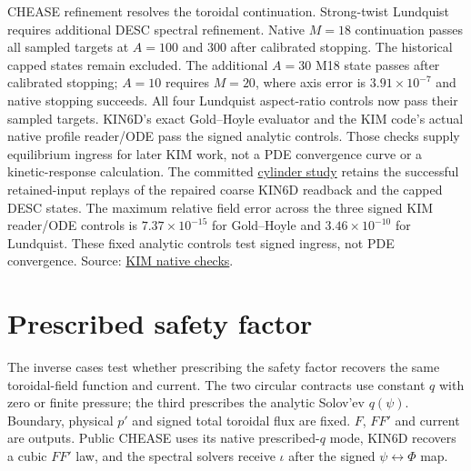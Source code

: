 \documentclass[10pt,a4paper]{article}
\newcommand{\tcroot}{https://gitlab.tugraz.at/plasma/proj/ntv/iter_tc24/-/blob/5f267d12c/}
\newcommand{\tcfile}[2]{\href{\tcroot#1}{#2}}
\newcommand{\pageheading}[1]{\clearpage\section{#1}}
\begin{document}
CHEASE refinement resolves the toroidal continuation. Strong-twist Lundquist
requires additional DESC spectral refinement. Native $M=18$ continuation
passes all sampled targets at $A=100$ and $300$ after calibrated stopping.
The historical capped states remain excluded. The additional $A=30$ M18
state passes after calibrated stopping; $A=10$ requires $M=20$, where axis
error is $3.91\times10^{-7}$ and native stopping succeeds. All four
Lundquist aspect-ratio controls now pass their sampled targets. KIN6D's exact Gold--Hoyle evaluator
and the KIM code's actual native profile reader/ODE pass the signed analytic
controls. Those checks supply equilibrium ingress for later KIM work, not a
PDE convergence curve or a kinetic-response calculation. The committed
\tcfile{equilibrium/phase5/results/README.md}{cylinder study} retains the
successful retained-input replays of the repaired coarse KIN6D readback
and the capped DESC states.
The maximum relative field error across the three signed KIM reader/ODE
controls is $7.37\times10^{-15}$ for Gold--Hoyle and $3.46\times10^{-10}$ for
Lundquist. These fixed analytic controls test signed ingress, not PDE
convergence. Source: \tcfile{equilibrium/phase5/results/native_checks.json}{KIM native checks}.

\pageheading{Prescribed safety factor}
The inverse cases test whether prescribing the safety factor recovers the
same toroidal-field function and current. The two circular contracts use
constant $q$ with zero or finite pressure; the third prescribes the analytic
Solov'ev $q(\psi)$. Boundary, physical $p'$ and signed total toroidal flux are
fixed. $F$, $FF'$ and current are outputs. Public CHEASE uses its native
prescribed-$q$ mode, KIN6D recovers a cubic $FF'$ law, and the spectral solvers
receive $\iota$ after the signed $\psi\leftrightarrow\Phi$ map.

\begin{center}\small

\end{center}
\end{document}
